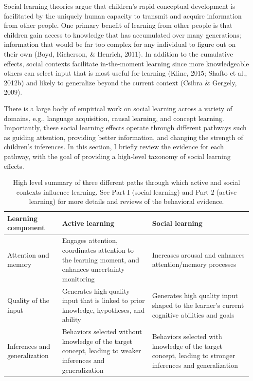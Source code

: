 \documentclass[english,floatsintext,man]{apa6}
\theoremstyle{definition}
\theoremstyle{definition}
\theoremstyle{definition}
\theoremstyle{remark}
\begin{document}
Social learning theories argue that children's rapid conceptual
development is facilitated by the uniquely human capacity to transmit
and acquire information from other people. One primary benefit of
learning from other people is that children gain access to knowledge
that has accumulated over many generations; information that would be
far too complex for any individual to figure out on their own (Boyd,
Richerson, \& Henrich, 2011). In addition to the cumulative effects,
social contexts facilitate in-the-moment learning since more
knowledgeable others can select input that is most useful for learning
(Kline, 2015; Shafto et al., 2012b) and likely to generalize beyond the
current context (Csibra \& Gergely, 2009).

There is a large body of empirical work on social learning across a
variety of domains, e.g., language acquisition, causal learning, and
concept learning. Importantly, these social learning effects operate
through different pathways such as guiding attention, providing better
information, and changing the strength of children's inferences. In this
section, I briefly review the evidence for each pathway, with the goal
of providing a high-level taxonomy of social learning effects.

\begin{table}[tb]
\centering
\caption{High level summary of three different paths through which active and social contexts influence learning. See Part I (social learning) and Part 2 (active learning) for more details and reviews of the behavioral evidence.} 
\label{act_soc}
\begin{tabular}{p{1.5in}|p{2in}|p{2in}}
 {\textbf{Learning component}} & {\textbf{Active learning}} & {\textbf{Social learning}} \\ 
  \hline
Attention and memory & Engages attention, coordinates attention to the learning moment, and enhances uncertainty monitoring & Increases arousal and enhances attention/memory processes \\ 
   \hline
Quality of the input & Generates high quality input that is linked to prior knowledge,  hypotheses, and ability & Generates high quality input shaped to the learner's current cognitive abilities and goals \\ 
   \hline
Inferences and generalization & Behaviors selected without knowledge of the target concept, leading to weaker inferences and generalization & Behaviors selected with knowledge of the target concept, leading to stronger inferences and generalization \\ 
   \hline
\end{tabular}
\end{table}
\end{document}
